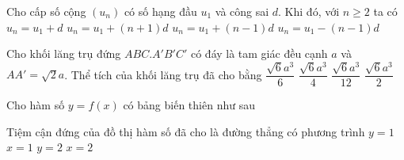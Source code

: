 \begin{ex}
	Cho cấp số cộng $(u_n)$ có số hạng đầu $u_1$ và công sai $d$. Khi đó, với $n\ge 2$ ta có
	\choice
	{$u_n=u_1+d$}
	{$u_n=u_1+\left(n+1\right)d$}
	{\True $u_n=u_1+\left(n-1\right)d$}
	{$u_n=u_1-\left(n-1\right)d$}
\end{ex}

\begin{ex}
	Cho khối lăng trụ đứng $ABC.A'B'C'$ có đáy là tam giác đều cạnh $a$ và $AA'=\sqrt{2}a$. Thể tích của khối lăng trụ đã cho bằng
	\choice
	{$\dfrac{\sqrt{6}a^3}{6}$}
	{\True $\dfrac{\sqrt{6}a^3}{4}$}
	{$\dfrac{\sqrt{6}a^3}{12}$}
	{$\dfrac{\sqrt{6}a^3}{2}$}
\end{ex}

\begin{ex}
	Cho hàm số $y=f(x)$ có bảng biến thiên như sau
	\begin{center}
	\end{center}
	Tiệm cận đứng của đồ thị hàm số đã cho là đường thẳng có phương trình
	\choice
	{$y=1$}
	{\True $x=1$}
	{$y=2$}
	{$x=2$}
\end{ex}

